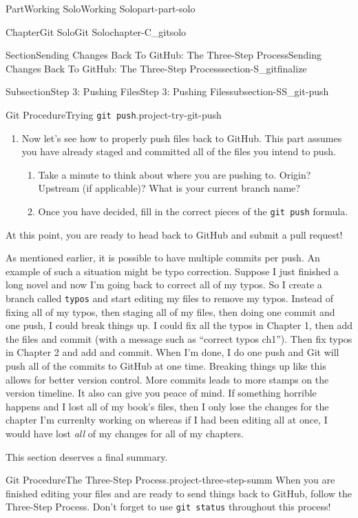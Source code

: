 \documentclass[twoside,10pt,]{book}
\newcommand{\mono}[1]{\texttt{#1}}
\begin{document}
\begin{partptx}{Part}{Working Solo}{}{Working Solo}{}{}{part-part-solo}
\begin{chapterptx}{Chapter}{Git Solo}{}{Git Solo}{}{}{chapter-C_gitsolo}
\begin{sectionptx}{Section}{Sending Changes Back To GitHub: The Three-Step Process}{}{Sending Changes Back To GitHub: The Three-Step Process}{}{}{section-S_gitfinalize}
\begin{subsectionptx}{Subsection}{Step 3: Pushing Files}{}{Step 3: Pushing Files}{}{}{subsection-SS_git-push}
\begin{project}{Git Procedure}{Trying \mono{git push}.}{project-try-git-push}
\begin{enumerate}[font=\bfseries,label=(\alph*),ref=\alph*]
\begin{enumerate}[font=\bfseries,label=(\roman*),ref=\theenumi.\roman*]
\item{}What if you remembered the branch, but not the remote? Try \mono{git push country}%
\end{enumerate}%
\item{}Now let's see how to properly push files back to GitHub. This part assumes you have already staged and committed all of the files you intend to push.%
\begin{enumerate}[font=\bfseries,label=(\roman*),ref=\theenumi.\roman*]%
\item{}Take a minute to think about where you are pushing to. Origin? Upstream (if applicable)? What is your current branch name?%
\item{}Once you have decided, fill in the correct pieces of the \mono{git push} formula.%
\end{enumerate}%
\end{enumerate}%
At this point, you are ready to head back to GitHub and submit a pull request!%
\end{project}%
As mentioned earlier, it is possible to have multiple commits per push. An example of such a situation might be typo correction. Suppose I just finished a long novel and now I'm going back to correct all of my typos. So I create a branch called \mono{typos} and start editing my files to remove my typos. Instead of fixing all of my typos, then staging all of my files, then doing one commit and one push, I could break things up. I could fix all the typos in Chapter 1, then add the files and commit (with a message such as ``correct typos ch1''). Then fix typos in Chapter 2 and add and commit. When I'm done, I do one push and Git will push all of the commits to GitHub at one time. Breaking things up like this allows for better version control. More commits leads to more stamps on the version timeline. It also can give you peace of mind. If something horrible happens and I lost all of my book's files, then I only lose the changes for the chapter I'm currenlty working on whereas if I had been editing all at once, I would have lost \emph{all} of my changes for all of my chapters.%
\par
This section deserves a final summary.%
\begin{project}{Git Procedure}{The Three-Step Process.}{project-three-step-summ}%
%
%
When you are finished editing your files and are ready to send things back to GitHub, follow the Three-Step Process. Don't forget to use \mono{git status} throughout this process!%
\begin{enumerate}

\end{enumerate}
\end{project}
\end{subsectionptx}
\end{sectionptx}
\end{chapterptx}
\end{partptx}
\end{document}
